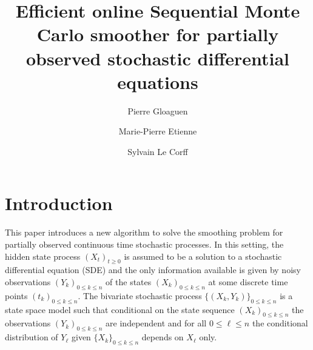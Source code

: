 \documentclass[12pt]{article}
\newcommand{\1}{\mathrm{1}}
\begin{document}
\author{Pierre Gloaguen\footnotemark[1] \and Marie-Pierre Etienne\footnotemark[1] \and Sylvain Le {C}orff\footnotemark[2]}
 


\title{Efficient online Sequential Monte Carlo smoother for partially observed stochastic differential equations}


\maketitle


\section{Introduction}
This paper introduces a new algorithm to solve the smoothing problem for partially observed continuous time stochastic processes. In this setting, the hidden state process $(X_t)_{t\ge 0}$ is assumed to be a solution to a stochastic differential equation (SDE) and the only information available is given by noisy observations $(Y_{k})_{0\le k\le n}$ of the states $(X_k)_{0\le k\le  n}$ at some discrete time points $(t_k)_{0\le k\le n}$. The bivariate stochastic process $\{(X_{k},Y_{k})\}_{0\le k\le n}$ is a state space model such that conditional on the state sequence $(X_{k})_{0\le k\le n}$ the observations $(Y_{k})_{0\le k\le n}$ are independent and for all $0\le \ell\le n$ the conditional distribution of $Y_{\ell}$ given $\{X_{k}\}_{0\le k\le n}$ depends on $X_{\ell}$ only.
\end{document}
